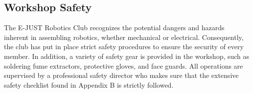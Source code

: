 \subsection{Workshop Safety}

The E-JUST Robotics Club recognizes the potential dangers and hazards inherent in assembling robotics, whether mechanical or electrical. Consequently, the club has put in place strict safety procedures to ensure the security of every member. In addition, a variety of safety gear is provided in the workshop, such as soldering fume extractors, protective gloves, and face guards. All operations are supervised by a professional safety director who makes sure that the extensive safety checklist found in Appendix B is strictly followed.
